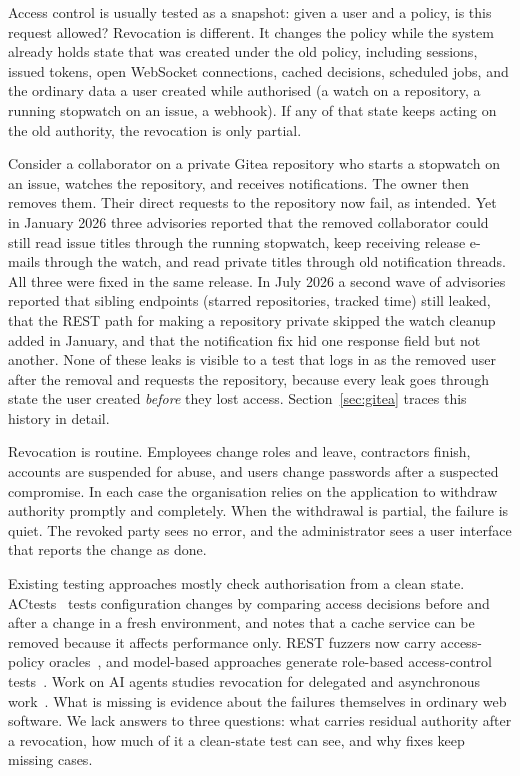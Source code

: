 \documentclass[preprint,12pt]{elsarticle}
\begin{document}
Access control is usually tested as a snapshot: given a user and a policy, is this request allowed?
Revocation is different. It changes the policy while the system already holds state that was created
under the old policy, including sessions, issued tokens, open WebSocket connections, cached decisions,
scheduled jobs, and the ordinary data a user created while authorised (a watch on a repository, a
running stopwatch on an issue, a webhook). If any of that state keeps acting on the old authority, the
revocation is only partial.

Consider a collaborator on a private Gitea repository who starts a stopwatch on an issue, watches the
repository, and receives notifications. The owner then removes them. Their direct requests to the repository now
fail, as intended. Yet in January 2026 three advisories reported that the removed collaborator could still read issue
titles through the running stopwatch, keep receiving release e-mails through the watch, and read private titles
through old notification threads. All three were fixed in the same release. In July 2026 a second wave of advisories
reported that sibling endpoints (starred repositories, tracked time) still leaked, that the
REST path for making a repository private skipped the watch cleanup added in January, and that the notification
fix hid one response field but not another. None of these leaks is visible to a test that logs in as the
removed user after the removal and requests the repository, because every leak goes through state the user
created \emph{before} they lost access. Section~\ref{sec:gitea} traces this history in detail.

Revocation is routine. Employees change roles and leave, contractors finish, accounts are suspended for abuse,
and users change passwords after a suspected compromise. In each case the organisation relies on the
application to withdraw authority promptly and completely. When the withdrawal is partial, the failure is quiet. The
revoked party sees no error, and the administrator sees a user interface that reports the change as done.

Existing testing approaches mostly check authorisation from a clean state. ACtests~\cite{xiang2025actests}
tests configuration changes by comparing access decisions before and after a change in a fresh
environment, and notes that a cache service can be removed because it affects performance only.
REST fuzzers now carry access-policy oracles~\cite{sahin2026evomaster}, and model-based
approaches generate role-based access-control tests~\cite{xu2015rbac}. Work on AI agents studies revocation
for delegated and asynchronous work~\cite{zhu2026agentrevocation,shen2026agentmemory}. What is missing is
evidence about the failures themselves in ordinary web software. We lack answers to three questions: what carries residual
authority after a revocation, how much of it a clean-state test can see, and why fixes keep missing cases.
\end{document}
